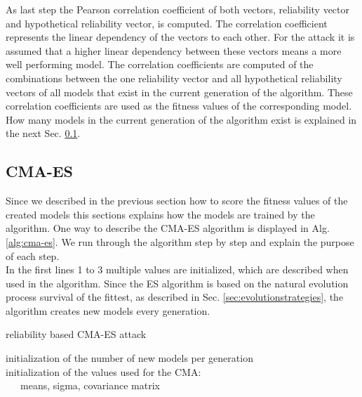 As last step the Pearson correlation coefficient of both vectors, reliability vector and hypothetical reliability vector, is computed.
The correlation coefficient represents the linear dependency of the vectors to each other.
For the attack it is assumed that a higher linear dependency between these vectors means a more well performing model.
The correlation coefficients are computed of the combinations between the one reliability vector and all hypothetical reliability vectors of all models that exist in the current generation of the algorithm.
These correlation coefficients are used as the fitness values of the corresponding model.
How many models in the current generation of the algorithm exist is explained in the next Sec. \ref{sec:cma-esdesign}.


\subsection{CMA-ES}
\label{sec:cma-esdesign}

Since we described in the previous section how to score the fitness values of the created models this sections explains how the models are trained by the algorithm.
One way to describe the \ac{CMA-ES} algorithm is displayed in Alg. \ref{alg:cma-es}.
We run through the algorithm step by step and explain the purpose of each step.\\
In the first lines 1 to 3 multiple values are initialized, which are described when used in the algorithm.
Since the \ac{ES} algorithm is based on the natural evolution process survival of the fittest, as described in Sec. \ref{sec:evolutionstrategies}, the algorithm creates new models every generation. %

\SetAlCapHSkip{0.2em}
\begin{algorithm}[H] %
\Indm
\SetAlgoLined
\caption{reliability based \acl{CMA-ES} attack}
\label{alg:cma-es}
\Indp

initialization of the number of new models per generation\\
initialization of the values used for the \ac{CMA}:\\
\ \ \ means, sigma, covariance matrix\\
\end{algorithm}


